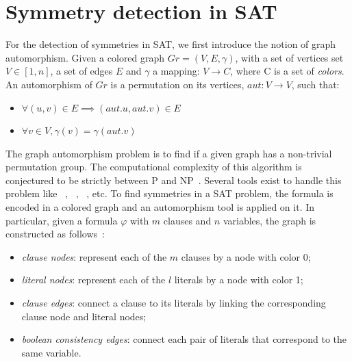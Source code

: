 \section{Symmetry detection in SAT}
For the detection of symmetries in SAT, we first introduce the notion of graph automorphism.
Given a colored graph $Gr = (V, E, \gamma)$, with a set of vertices set $V \in  [1, n] $, a set of edges $E$ and
$\gamma$ a mapping: $V \rightarrow C$, where C is a set of \emph{colors}.
An automorphism of $Gr$ is a permutation on its vertices, $aut :V \rightarrow V$,
such that:
\begin{itemize}
 \item $\forall (u, v) \in E \implies (aut.u, aut.v) \in E$
 \item $\forall v \in V, \gamma(v) = \gamma(aut.v)$
\end{itemize}
The graph automorphism problem is to find if a given graph has a non-trivial permutation group. 
The computational complexity of this algorithm is conjectured to be strictly between P and NP~\cite{kobler2012graph,toran2004hardness}.
Several tools exist to handle this problem like \saucy~\cite{katebi2010symmetry},
\bliss~\cite{JunttilaKaski:ALENEX2007}, \nauty~\cite{mckay2003nauty}, etc.
%
To find symmetries in a SAT problem, the formula is encoded in a colored graph
and an automorphism tool is applied on it. In particular, given a formula $\varphi$ with
$m$ clauses and $n$ variables, the graph is constructed as follows~\cite{biere2009handbook}:
\begin{itemize}
 \item \emph{clause nodes}: represent each of the $m$ clauses by a node with color 0;
 \item \emph{literal nodes}: represent each of the $l$ literals by a node with color 1;
 \item \emph{clause edges}: connect a clause to its literals by linking the corresponding  clause node and literal nodes;
 \item \emph{boolean consistency edges}: connect each pair of literals that correspond to the same variable.
\end{itemize}
